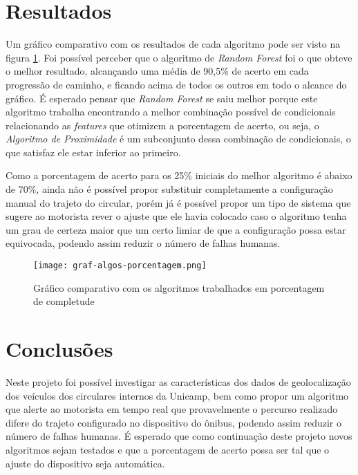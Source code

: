 \documentclass[11pt,twoside]{article}
\begin{document}
\section{Resultados}

Um gráfico comparativo com os resultados de cada algoritmo pode ser visto na figura \ref{fig:algo-grafos}. Foi possível perceber que o algoritmo de \emph{Random Forest} foi o que obteve o melhor resultado, alcançando uma média de 90,5\% de acerto em cada progressão de caminho, e ficando acima de todos os outros em todo o alcance do gráfico. É esperado pensar que \emph{Random Forest} se saiu melhor porque este algoritmo trabalha encontrando a melhor combinação possível de condicionais relacionando as \emph{features} que otimizem a porcentagem de acerto, ou seja, o \emph{Algoritmo de Proximidade} é um subconjunto dessa combinação de condicionais, o que satisfaz ele estar inferior ao primeiro.

Como a porcentagem de acerto para os 25\% iniciais do melhor algoritmo é abaixo de 70\%, ainda não é possível propor substituir completamente a configuração manual do trajeto do circular, porém já é possível propor um tipo de sistema que sugere ao motorista rever o ajuste que ele havia colocado caso o algoritmo tenha um grau de certeza maior que um certo limiar de que a configuração possa estar equivocada, podendo assim reduzir o número de falhas humanas.

\begin{figure}
  \centering
  \texttt{[image: graf-algos-porcentagem.png]}
  \caption{Gráfico comparativo com os algoritmos trabalhados em porcentagem de completude}
  \label{fig:algo-grafos}
\end{figure}

\section{Conclusões}

Neste projeto foi possível investigar as características dos dados de geolocalização dos veículos dos circulares internos da Unicamp, bem como propor um algoritmo que alerte ao motorista em tempo real que provavelmente o percurso realizado difere do trajeto configurado no dispositivo do ônibus, podendo assim reduzir o número de falhas humanas. É esperado que como continuação deste projeto novos algoritmos sejam testados e que a porcentagem de acerto possa ser tal que o ajuste do dispositivo seja automática.
\end{document}
